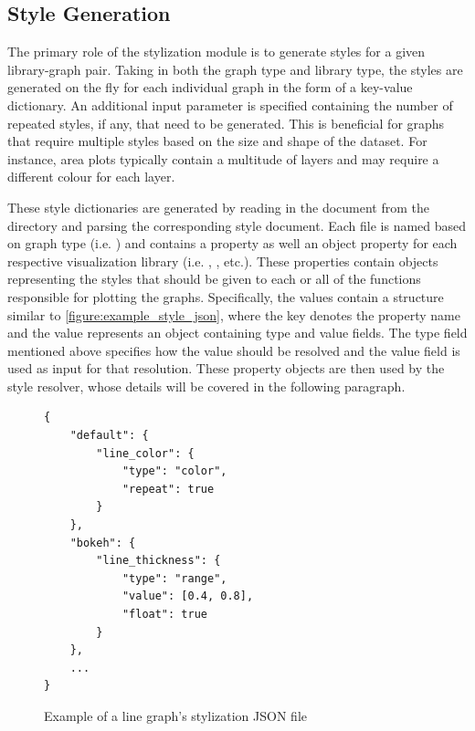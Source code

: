 \subsection{Style Generation}
\label{subsection:style_generation}
The primary role of the stylization module is to generate styles for a given library-graph pair. Taking in both the graph type and library type, the styles are generated on the fly for each individual graph in the form of a key-value dictionary. An additional input parameter is specified containing the number of repeated styles, if any, that need to be generated. This is beneficial for graphs that require multiple styles based on the size and shape of the dataset. For instance, area plots typically contain a multitude of layers and may require a different colour for each layer.

\hfill

These style dictionaries are generated by reading in the  document from the  directory and parsing the corresponding style document. Each file is named based on graph type (i.e. ) and contains a  property as well an object property for each respective visualization library (i.e. , , etc.). These properties contain objects representing the styles that should be given to each or all of the functions responsible for plotting the graphs. Specifically, the values contain a structure similar to \autoref{figure:example_style_json}, where the key denotes the property name and the value represents an object containing type and value fields. The type field mentioned above specifies how the value should be resolved and the value field is used as input for that resolution. These property objects are then used by the style resolver, whose details will be covered in the following paragraph.

\begin{figure}
    \begin{verbatim}
{     
    "default": {
        "line_color": {
            "type": "color",
            "repeat": true
        }
    },
    "bokeh": {
        "line_thickness": {
            "type": "range",
            "value": [0.4, 0.8],
            "float": true
        }
    },
    ...
}
    \end{verbatim}
    \caption{Example of a line graph's stylization JSON file} 
    \label{figure:example_style_json}
\end{figure}

